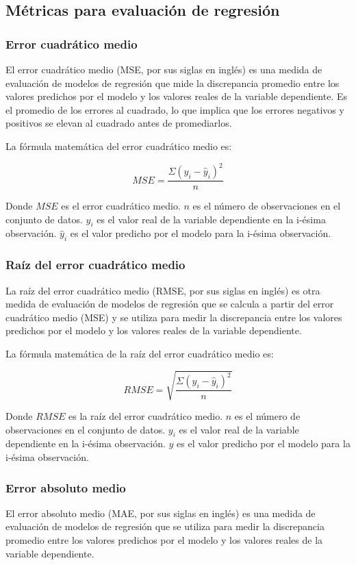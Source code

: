 \subsection{Métricas para evaluación de regresión}
\subsubsection{Error cuadrático medio}
El error cuadrático medio (MSE, por sus siglas en inglés) es una medida de evaluación de modelos de regresión que mide la discrepancia promedio entre los valores predichos por el modelo y los valores reales de la variable dependiente. Es el promedio de los errores al cuadrado, lo que implica que los errores negativos y positivos se elevan al cuadrado antes de promediarlos.

La fórmula matemática del error cuadrático medio es:

$$MSE = \frac{\Sigma (y_i - \hat{y}_i)^2}{n}$$

Donde $MSE$ es el error cuadrático medio. $n$ es el número de observaciones en el conjunto de datos. $y_i$ es el valor real de la variable dependiente en la i-ésima observación. $\hat{y}_i$ es el valor predicho por el modelo para la i-ésima observación.


\subsubsection{Raíz del error cuadrático medio}
La raíz del error cuadrático medio (RMSE, por sus siglas en inglés) es otra medida de evaluación de modelos de regresión que se calcula a partir del error cuadrático medio (MSE) y se utiliza para medir la discrepancia entre los valores predichos por el modelo y los valores reales de la variable dependiente.

La fórmula matemática de la raíz del error cuadrático medio es:

$$RMSE = \sqrt{\frac{\Sigma (y_i - \hat{y}_i)^2}{n}}$$

Donde $RMSE$ es la raíz del error cuadrático medio. $n$ es el número de observaciones en el conjunto de datos. $y_i$ es el valor real de la variable dependiente en la i-ésima observación. $\hat{y}$ es el valor predicho por el modelo para la i-ésima observación.


\subsubsection{Error absoluto medio}
El error absoluto medio (MAE, por sus siglas en inglés) es una medida de evaluación de modelos de regresión que se utiliza para medir la discrepancia promedio entre los valores predichos por el modelo y los valores reales de la variable dependiente.

